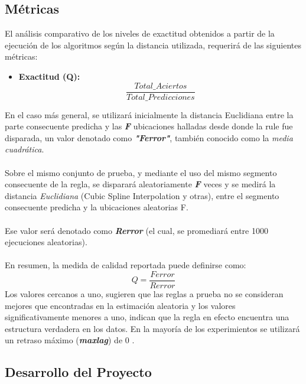 \subsection{M\'etricas}
El an\'alisis comparativo de los niveles de exactitud obtenidos a partir de la ejecuci\'on de los algoritmos seg\'un la distancia utilizada, requerir\'a de las siguientes m\'etricas:
\begin{itemize}
\item \textbf{Exactitud (Q):}
\begin{equation}
 \frac{Total\_Aciertos} {Total\_Predicciones}
\end{equation}
\end{itemize}
En el caso m\'as general, se utilizar\'a inicialmente la distancia Euclidiana entre la parte consecuente predicha y las \textit{\textbf{F}} ubicaciones halladas desde donde la rule fue disparada, un valor denotado como \textit{\textbf{"Ferror"}}, tambi\'en conocido como la \textit{media cuadr\'atica}.\\\\
Sobre el mismo conjunto de prueba, y mediante el uso del mismo segmento consecuente de la regla, se disparar\'a aleatoriamente \textit{\textbf{F}} veces y se medir\'a la distancia \textit{Euclidiana} (Cubic Spline Interpolation y otras), entre el segmento consecuente predicha y la ubicaciones aleatorias F.\\\\
Ese valor ser\'a denotado como \textit{\textbf{Rerror}} (el cual, se promediar\'a entre 1000 ejecuciones aleatorias).\\\\
En resumen, la medida de calidad reportada puede definirse como: 
\begin{equation} 
Q = \frac{Ferror}{Rerror} 
\end{equation}
Los valores cercanos a uno, sugieren que las reglas a prueba no se consideran mejores que encontradas en la estimaci\'on aleatoria y los valores significativamente menores a uno, indican que la regla en efecto encuentra una estructura verdadera en los datos. En la mayor\'ia de los experimientos se utilizar\'a un retraso m\'aximo (\textit{\textbf{maxlag}}) de 0 .
\subsection{Desarrollo del Proyecto}